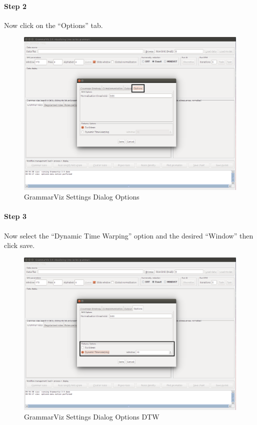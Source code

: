 \documentclass[letterpaper, 12pt]{article}
\begin{document}
\newpage
\paragraph{Step 2}
Now click on the ``Options'' tab.

\begin{figure}[H]
  \includegraphics[width=\textwidth]{grammarviz-settings-dialog-options}
  \caption{GrammarViz Settings Dialog Options}
  \label{fig:grammarviz-settings-dialog-options}
\end{figure}

\newpage
\paragraph{Step 3}
Now select the ``Dynamic Time Warping'' option and the desired ``Window'' then click save.

\begin{figure}[H]
  \includegraphics[width=\textwidth]{grammarviz-settings-dialog-options-dtw}
  \caption{GrammarViz Settings Dialog Options DTW}
  \label{fig:grammarviz-settings-dialog-options-dtw}
\end{figure}
\end{document}
